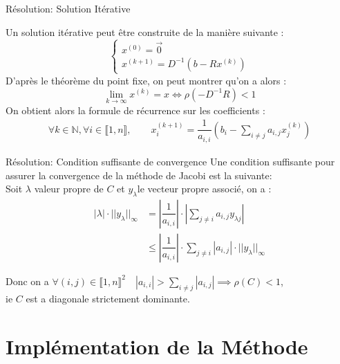 \documentclass{beamer}
\begin{document}
\begin{frame}{Résolution: Solution Itérative}

  Un solution itérative peut \^etre construite de la manière suivante :
  \[
      \left\{
      \begin{array}{l}
          x^{(0)} = \vec{0}\\
          x^{(k+1)} = D^{-1}( b - Rx^{(k)})
      \end{array}
      \right.
  \]
  D'après le théorème du point fixe, on peut montrer qu'on a alors :
  \[
  \lim_{k \to \infty}x^{(k)} = x \Leftrightarrow \rho(-D^{-1}R) < 1
  \]
  On obtient alors la formule de récurrence sur les coefficients :
  \begin{align} \label{eq:recu}
      \forall k \in \mathbb{N}, \forall i \in \llbracket 1,n \rrbracket, 
      \qquad x_{i}^{(k+1)} = \dfrac{1}{a_{i,i}}(b_i - \sum_{i \neq j}a_{i,j} x^{(k)}_j)
  \end{align}

\end{frame}

\begin{frame}{Résolution: Condition suffisante de convergence}
  Une condition suffisante pour assurer la convergence de la méthode de Jacobi est la suivante:\\

  Soit $\lambda$ valeur propre de $C$ et $y_{\lambda}$le vecteur propre associé, on a :
  \begin{align*}
    |\lambda|\cdot||y_{\lambda}||_{\infty} &= |\dfrac{1}{a_{i,i}}| \cdot |\sum_{j \neq i}a_{i,j}y_{\lambda{j}}|\\
    &\leq |\dfrac{1}{a_{i,i}}| \cdot \sum_{j \neq i}|a_{i,j}| \cdot ||y_\lambda||_{\infty}
  \end{align*} 

  Donc on a $\forall (i,j) \in \llbracket 1,n \rrbracket^2 \quad |a_{i,i}| > \sum_{i \neq j}|a_{i,j}| \implies \rho(C) < 1$,\\
  ie $C$ est a diagonale strictement dominante.
\end{frame}

\section{Implémentation de la Méthode}
\end{document}
